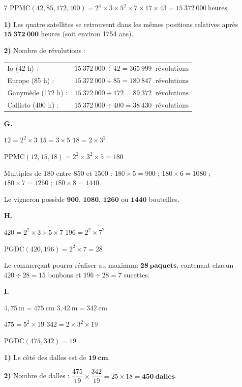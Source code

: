 \begin{solution}{7}
$\text{PPMC}(42, 85, 172, 400) = 2^4 \times 3 \times 5^2 \times 7 \times 17 \times 43 = 15\ 372\ 000\ \text{heures}$

\textbf{1)} Les quatre satellites se retrouvent dans les mêmes positions relatives après $\mathbf{15\ 372\ 000}$ heures (soit environ 1754 ans).

\textbf{2)} Nombre de révolutions :

\begin{tabular}{ll}
Io (42 h) :       & $15\ 372\ 000 \div 42 = 365\ 999\ \text{ révolutions}$ \\[4pt]
Europe (85 h) :   & $15\ 372\ 000 \div 85 = 180\ 847\ \text{ révolutions}$ \\[4pt]
Ganymède (172 h) :& $15\ 372\ 000 \div 172 = 89\ 372\ \text{ révolutions}$ \\[4pt]
Callisto (400 h) :& $15\ 372\ 000 \div 400 = 38\ 430\ \text{ révolutions}$ \\[4pt]
\end{tabular}

\bigskip
\textbf{G.}

$12 = 2^2 \times 3$ \quad $15 = 3 \times 5$ \quad $18 = 2 \times 3^2$

$\text{PPMC}(12, 15, 18) = 2^2 \times 3^2 \times 5 = 180$

Multiples de 180 entre 850 et 1500 : $180 \times 5 = 900$ ; $180 \times 6 = 1080$ ; $180 \times 7 = 1260$ ; $180 \times 8 = 1440$.

Le vigneron possède $\mathbf{900}$, $\mathbf{1080}$, $\mathbf{1260}$ ou $\mathbf{1440}$ bouteilles.

\bigskip
\textbf{H.}

$420 = 2^2 \times 3 \times 5 \times 7$ \quad $196 = 2^2 \times 7^2$

$\text{PGDC}(420, 196) = 2^2 \times 7 = 28$

Le commerçant pourra réaliser au maximum $\mathbf{28\ paquets}$, contenant chacun $420 \div 28 = 15$ bonbons et $196 \div 28 = 7$ sucettes.

\bigskip
\textbf{I.}

$4{,}75\ \text{m} = 475\ \text{cm}$ \quad $3{,}42\ \text{m} = 342\ \text{cm}$

$475 = 5^2 \times 19$ \quad $342 = 2 \times 3^2 \times 19$

$\text{PGDC}(475, 342) = 19$

\textbf{1)} Le côté des dalles est de $\mathbf{19\ cm}$.

\textbf{2)} Nombre de dalles : $\dfrac{475}{19} \times \dfrac{342}{19} = 25 \times 18 = \mathbf{450\ dalles}$.


\end{solution}
